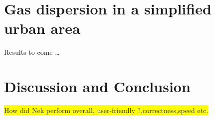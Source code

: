 \section{Gas dispersion in a simplified urban area} 
Results to come \ldots 

\section{Discussion and Conclusion}
\colorbox{yellow}{How did Nek perform overall, user-friendly ?,correctness,speed etc.}

